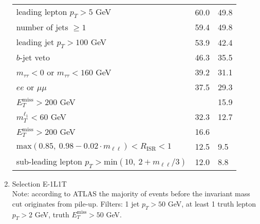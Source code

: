 \documentclass[12pt,fleqn]{article}
\begin{document}
\begin{enumerate}
\begin{table}[h!]
\begin{center}
\begin{tabular}{l|p{3cm}|p{3cm}}
  leading lepton $p_T > 5$ GeV                                                     &  60.0    &  49.8  \\
  number of jets $\geq 1$                                                         &  59.4    &  49.8  \\
  leading jet $p_T > 100 $ GeV                                                    &  53.9    &  42.4  \\ 
  $b$-jet veto                                                                    &  46.3    &  35.5  \\
  $m_{\tau\tau} < 0$ or $m_{\tau\tau} < 160$ GeV                                  &  39.2    &  31.1  \\
  $ee$ or $\mu\mu$                                                                &  37.5    &  29.3  \\
  $E_T^\mathrm{miss} > 200$ GeV                                                   &          &  15.9  \\
  $ m_T^{\ell_1} < 60$ GeV                                                        &  32.3    &  12.7  \\
  $E_T^\mathrm{miss} > 200$ GeV                                                   &  16.6    &        \\
  $\mathrm{max}(0.85,\ 0.98-0.02 \cdot m_{\ell\ell}) < R_\mathrm{ISR} <1$         &  12.5    &  9.5  \\
  sub-leading lepton $p_T > \mathrm{min}(10,\ 2+m_{\ell\ell}/3)$                  &  12.0    &   8.8  \\
  \bottomrule
 \end{tabular} \end{center}
\end{table} 
 
\newpage 
 
\item{Selection E-1L1T}\\
Note: according to ATLAS the majority of events before the invariant mass cut originates from pile-up. Filters: 1 jet $p_T > 50$ GeV, at least 1 truth lepton $p_T > 2$ GeV, truth $E_T^\mathrm{miss} > 50$ GeV.


\end{enumerate}
\end{document}
